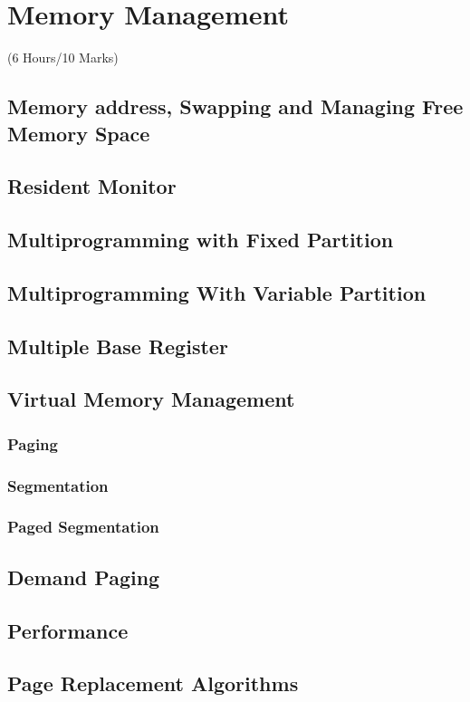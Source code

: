 \documentclass[12pt]{article}
\begin{document}
\pagebreak
\section{Memory Management}
\begin{center}(6 Hours/10 Marks)\end{center}
\subsection{Memory address, Swapping and Managing Free Memory Space}
\subsection{Resident Monitor}
\subsection{Multiprogramming with Fixed Partition}
\subsection{Multiprogramming With Variable Partition}
\subsection{Multiple Base Register}
\subsection{Virtual Memory Management}
\subsubsection{Paging}
\subsubsection{Segmentation}
\subsubsection{Paged Segmentation}
\subsection{Demand Paging}
\subsection{Performance}
\subsection{Page Replacement Algorithms}
\end{document}
